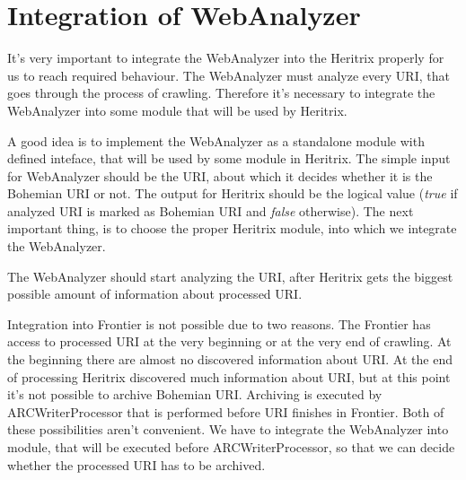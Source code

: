 \documentclass[11pt,a4paper]{article}
\begin{document}

\section{Integration of WebAnalyzer}

It's very important to integrate the WebAnalyzer into the Heritrix properly for us to reach required behaviour. The WebAnalyzer must analyze every URI, that goes through the process of crawling. Therefore it's necessary to integrate the WebAnalyzer into some module that will be used by Heritrix.

A good idea is to implement the WebAnalyzer as a standalone module with defined inteface, that will be used by some module in Heritrix. The simple input for WebAnalyzer should be the URI, about which it decides whether it is the Bohemian URI or not. The output for Heritrix should be the logical value (\emph{true} if analyzed URI is marked as Bohemian URI and \emph{false} otherwise). The next important thing, is to choose the proper Heritrix module, into which we integrate the WebAnalyzer.

The WebAnalyzer should start analyzing the URI, after Heritrix gets the biggest possible amount of information about processed URI.

Integration into Frontier is not possible due to two reasons. The Frontier has access to processed URI at the very beginning or at the very end of crawling. At the beginning there are almost no discovered information about URI. At the end of processing Heritrix discovered much information about URI, but at this point it's not possible to archive Bohemian URI. Archiving is executed by ARCWriterProcessor that is performed before URI finishes in Frontier. Both of these possibilities aren't convenient. We have to integrate the WebAnalyzer into module, that will be executed before \mbox{ARCWriterProcessor}, so that we can decide whether the processed URI has to be archived.
\end{document}

